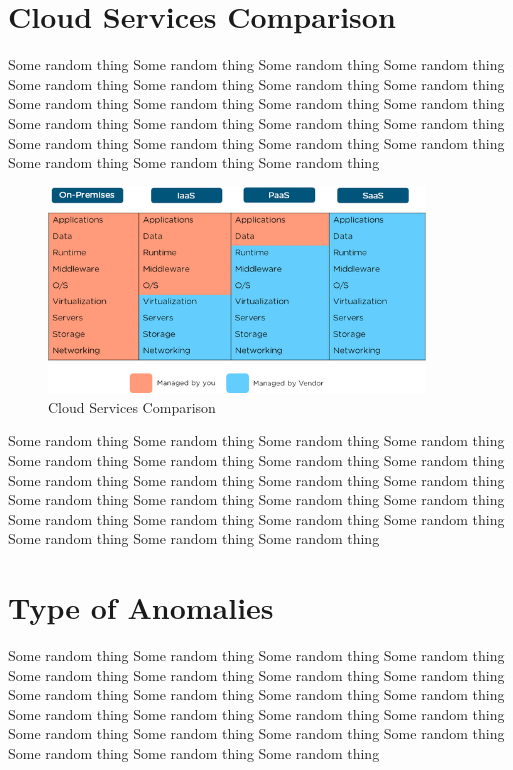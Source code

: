 \section{Cloud Services Comparison}
Some random thing Some random thing Some random thing Some random thing Some random thing Some random thing Some random thing Some random thing Some random thing Some random thing Some random thing Some random thing Some random thing Some random thing Some random thing Some random thing Some random thing Some random thing Some random thing Some random thing Some random thing Some random thing Some random thing  
\begin{figure} [h]
	\centering
	\includegraphics[width=10cm]{texfiles/images/cloud services comparison.png}
	\caption{Cloud Services Comparison \protect\cite{namitk2011}}
	\label{fig:my_label}
\end{figure}
Some random thing Some random thing Some random thing Some random thing Some random thing Some random thing Some random thing Some random thing Some random thing Some random thing Some random thing Some random thing Some random thing Some random thing Some random thing Some random thing Some random thing Some random thing Some random thing Some random thing Some random thing Some random thing Some random thing  
\section{Type of Anomalies}

Some random thing Some random thing Some random thing Some random thing Some random thing Some random thing Some random thing Some random thing Some random thing Some random thing Some random thing Some random thing Some random thing Some random thing Some random thing Some random thing Some random thing Some random thing Some random thing Some random thing Some random thing Some random thing Some random thing  


